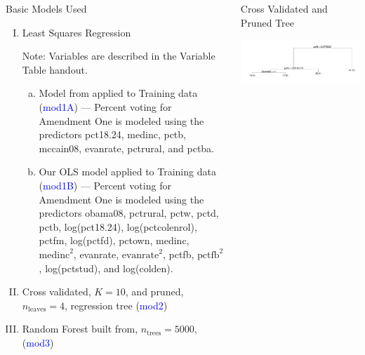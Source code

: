 \documentclass[final]{beamer}\usepackage[]{graphicx}\usepackage[]{color}
\makeatletter
\def\maxwidth{ %
  \ifdim\Gin@nat@width>\linewidth
    \linewidth
  \else
    \Gin@nat@width
  \fi
}
\newenvironment{knitrout}{}{} %
\makeatother
\begin{document}
\begin{frame}[fragile]
\begin{columns}[t]
\begin{column}{0.31\linewidth}
\begin{minipage}[t][.955\textheight]{\linewidth}
\begin{block}{Basic Models Used}
\begin{enumerate}[I.]
\item Least Squares Regression
\vspace{2ex}

Note: Variables are described in the Variable Table handout.
\begin{enumerate}[a.]
\item Model from \cite{DE12} applied to Training data (\textcolor{blue}{mod1A}) --- Percent voting for Amendment One is modeled using the predictors pct18.24, medinc, pctb, mccain08, evanrate, pctrural, and pctba. 
\item Our OLS model applied to Training data (\textcolor{blue}{mod1B}) --- Percent voting for Amendment One is modeled using the predictors obama08, pctrural, pctw, pctd, pctb, log(pct18.24), log(pctcolenrol), pctfm, log(pctfd), pctown,  medinc, $\text{medinc}^2$, evanrate, $\text{evanrate}^2$, pctfb, $\text{pctfb}^2$, log(pctstud), and log(colden).
\end{enumerate}
\item Cross validated, $K = 10$, and pruned, $n_{\text{leaves}}=4$, regression tree \cite{JF09} (\textcolor{blue}{mod2})
\item Random Forest built from, $n_{\text{trees}} = 5000 $, \cite{AL02} (\textcolor{blue}{mod3})
\end{enumerate}
\vspace{0ex}

\end{block}
\vfill

\end{minipage}
\end{column}%


\begin{column}{0.31\linewidth}
\begin{minipage}[t][.955\textheight]{\linewidth} 
\begin{block}{Cross Validated and Pruned Tree}
\begin{knitrout}
\color{fgcolor}

{\centering \includegraphics[width=\maxwidth]{figure/TREE-1} 

}
\end{knitrout}
\end{block}
\end{minipage}
\end{column}
\end{columns}
\end{frame}
\end{document}
